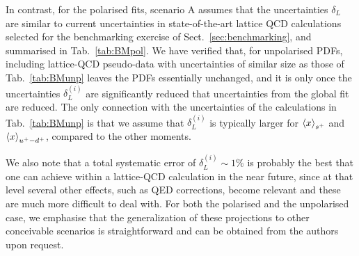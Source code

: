     In contrast, for the polarised fits,
    scenario A assumes that the uncertainties $\delta_L$
    are similar to current uncertainties in
    state-of-the-art lattice QCD calculations
    selected for the benchmarking exercise of Sect.~\ref{sec:benchmarking},
    and summarised in Tab.~\ref{tab:BMpol}.
    We have verified that, for unpolarised PDFs,
    including lattice-QCD pseudo-data with uncertainties of similar size as those of Tab.~\ref{tab:BMunp}
    leaves the PDFs essentially unchanged, and it is only once the uncertainties
    $\delta_L^{(i)}$ are significantly reduced that uncertainties from the global fit
    are reduced.
    The only connection with the uncertainties of the calculations in Tab.~\ref{tab:BMunp}
    is that we assume that $\delta_L^{(i)}$ is typically larger for $\left\langle x\right\rangle_{s^+}$
        and $\left\langle x\right\rangle_{u^+-d^+}$, compared to the other moments.

    We also note that
    a total systematic error of $\delta_L^{(i)}\sim 1\%$
    is probably the best that one can achieve
    within a lattice-QCD calculation in the near future, since at that level several other
    effects, such as QED corrections,
    become relevant and these are much more difficult
    to deal with.
    For both
    the polarised and
    the unpolarised case,
    we emphasise that the generalization of these projections to other conceivable scenarios
    is straightforward and can be obtained from the authors upon request.
 
